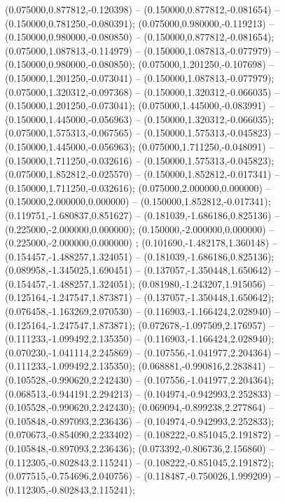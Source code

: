  (0.075000,0.877812,-0.120398) -- (0.150000,0.877812,-0.081654) -- (0.150000,0.781250,-0.080391);
 (0.075000,0.980000,-0.119213) -- (0.150000,0.980000,-0.080850) -- (0.150000,0.877812,-0.081654);
 (0.075000,1.087813,-0.114979) -- (0.150000,1.087813,-0.077979) -- (0.150000,0.980000,-0.080850);
 (0.075000,1.201250,-0.107698) -- (0.150000,1.201250,-0.073041) -- (0.150000,1.087813,-0.077979);
 (0.075000,1.320312,-0.097368) -- (0.150000,1.320312,-0.066035) -- (0.150000,1.201250,-0.073041);
 (0.075000,1.445000,-0.083991) -- (0.150000,1.445000,-0.056963) -- (0.150000,1.320312,-0.066035);
 (0.075000,1.575313,-0.067565) -- (0.150000,1.575313,-0.045823) -- (0.150000,1.445000,-0.056963);
 (0.075000,1.711250,-0.048091) -- (0.150000,1.711250,-0.032616) -- (0.150000,1.575313,-0.045823);
 (0.075000,1.852812,-0.025570) -- (0.150000,1.852812,-0.017341) -- (0.150000,1.711250,-0.032616);
 (0.075000,2.000000,0.000000) -- (0.150000,2.000000,0.000000) -- (0.150000,1.852812,-0.017341);
 (0.119751,-1.680837,0.851627) -- (0.181039,-1.686186,0.825136) -- (0.225000,-2.000000,0.000000);
 (0.150000,-2.000000,0.000000) -- (0.225000,-2.000000,0.000000) ;
 (0.101690,-1.482178,1.360148) -- (0.154457,-1.488257,1.324051) -- (0.181039,-1.686186,0.825136);
 (0.089958,-1.345025,1.690451) -- (0.137057,-1.350448,1.650642) -- (0.154457,-1.488257,1.324051);
 (0.081980,-1.243207,1.915056) -- (0.125164,-1.247547,1.873871) -- (0.137057,-1.350448,1.650642);
 (0.076458,-1.163269,2.070530) -- (0.116903,-1.166424,2.028940) -- (0.125164,-1.247547,1.873871);
 (0.072678,-1.097509,2.176957) -- (0.111233,-1.099492,2.135350) -- (0.116903,-1.166424,2.028940);
 (0.070230,-1.041114,2.245869) -- (0.107556,-1.041977,2.204364) -- (0.111233,-1.099492,2.135350);
 (0.068881,-0.990816,2.283841) -- (0.105528,-0.990620,2.242430) -- (0.107556,-1.041977,2.204364);
 (0.068513,-0.944191,2.294213) -- (0.104974,-0.942993,2.252833) -- (0.105528,-0.990620,2.242430);
 (0.069094,-0.899238,2.277864) -- (0.105848,-0.897093,2.236436) -- (0.104974,-0.942993,2.252833);
 (0.070673,-0.854090,2.233402) -- (0.108222,-0.851045,2.191872) -- (0.105848,-0.897093,2.236436);
 (0.073392,-0.806736,2.156860) -- (0.112305,-0.802843,2.115241) -- (0.108222,-0.851045,2.191872);
 (0.077515,-0.754696,2.040756) -- (0.118487,-0.750026,1.999209) -- (0.112305,-0.802843,2.115241);
